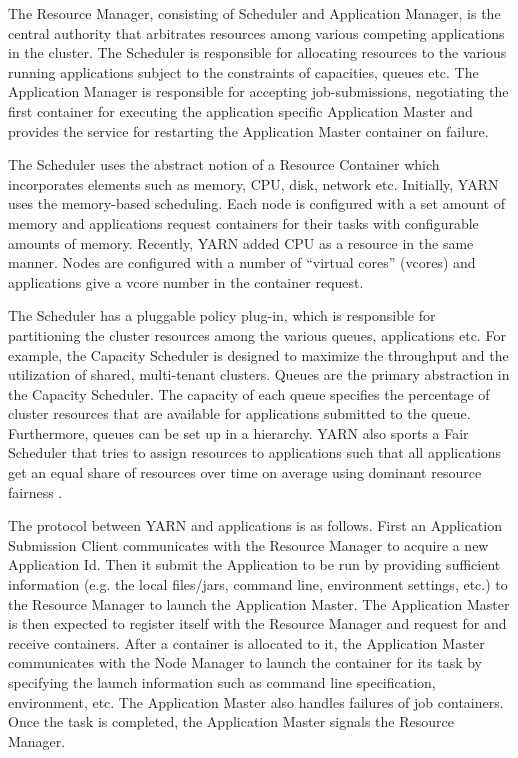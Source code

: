\documentclass[11pt]{book}
\begin{document}
The Resource Manager, consisting of Scheduler and Application Manager, is the central authority that arbitrates resources among various competing applications in the cluster.
The Scheduler is responsible for allocating resources to the various running applications subject to the constraints of capacities, queues etc.
The Application Manager is responsible for accepting job-submissions, negotiating the first container for executing the application specific Application Master and provides the service for restarting the Application Master container on failure.

The Scheduler uses the abstract notion of a Resource Container which incorporates elements such as memory, CPU, disk, network etc. Initially, YARN uses the memory-based scheduling. Each node is configured with a set amount of memory and applications  request containers for their tasks with configurable amounts of memory. Recently, YARN added CPU as a resource in the same manner. Nodes are configured with a number of ``virtual cores'' (vcores) and applications give a vcore number in the container request.

The Scheduler has a pluggable policy plug-in, which is responsible for partitioning the cluster resources among the various queues, applications etc. For example, the Capacity Scheduler is designed to maximize the throughput and the utilization of shared, multi-tenant clusters.
Queues are the primary abstraction in the Capacity Scheduler. The capacity of each queue specifies the percentage of cluster resources that are available for applications submitted to the queue. Furthermore, queues can be set up in a hierarchy. YARN also sports a Fair Scheduler  that tries to assign resources to applications such that all applications get an equal share of resources over time on average using dominant resource fairness \cite{Ghodsi:2011:DRF}.

The protocol between YARN and applications is as follows. First an Application Submission Client communicates with the Resource Manager to acquire a new Application Id. Then it submit the Application to be run by providing sufficient information (e.g. the local files/jars, command line, environment settings, etc.) to the Resource Manager to launch the Application Master. 
The Application Master is then expected to register itself with the Resource Manager and request for and receive containers. After a container is allocated to it, the Application Master communicates with the Node Manager to launch the container for its task by specifying the launch information such as command line specification, environment, etc. The Application Master also handles failures of job containers. Once the task is completed, the Application Master signals the Resource Manager.
\end{document}
